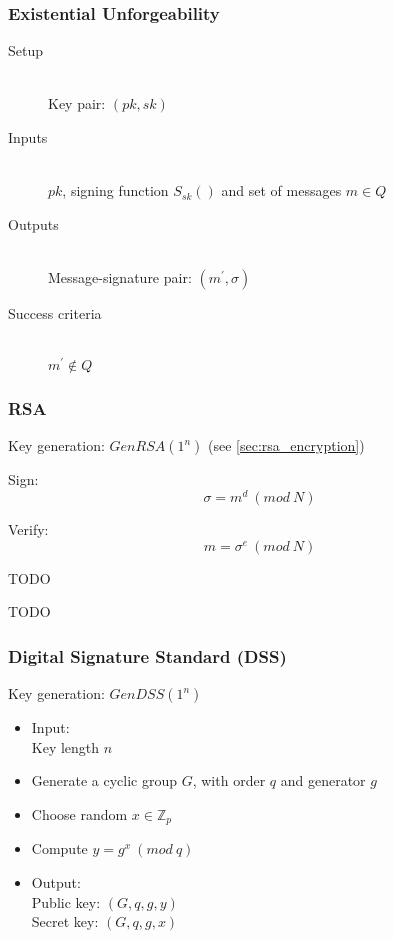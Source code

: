 \documentclass[a4paper]{article}
\begin{document}
\subsubsection{Existential Unforgeability}

\begin{description}
  \item[Setup] \hfill \\
    Key pair: $(pk, sk)$
  \item[Inputs] \hfill \\
    $pk$, signing function $S_{sk}()$ and set of messages $m \in Q$
  \item[Outputs] \hfill \\
    Message-signature pair: $(m^{\prime}, \sigma)$
  \item[Success criteria] \hfill \\
    $m^{\prime} \not\in Q$
\end{description}

\subsubsection{RSA}

Key generation: $GenRSA(1^{n})$ (see \ref{sec:rsa_encryption})

Sign:
\[
  \sigma = m^{d} \: (mod \: N)
\]

Verify:
\[
  m = \sigma^{e} \: (mod \: N)
\]


TODO


TODO

\subsubsection{Digital Signature Standard (DSS)}
\label{sec:dsa_signatures}

Key generation: $GenDSS(1^{n})$
\begin{itemize}
  \item
    Input: \\
    Key length $n$
  \item Generate a cyclic group $G$, with order $q$ and generator $g$
  \item Choose random $x \in \mathbb{Z}_{p}$
  \item Compute $y = g^{x} \: (mod \: q)$
  \item
    Output: \\
    Public key: $(G, q, g, y)$ \\
    Secret key: $(G, q, g, x)$
\end{itemize}
\end{document}
